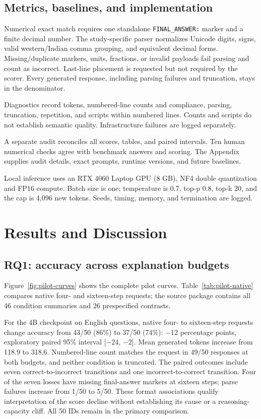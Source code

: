 \documentclass[11pt]{article}
\begin{document}
\subsection{Metrics, baselines, and implementation}
Numerical exact match requires one standalone \texttt{FINAL\_ANSWER:} marker and a finite decimal number. The study-specific parser normalizes Unicode digits, signs, valid western/Indian comma grouping, and equivalent decimal forms. Missing/duplicate markers, units, fractions, or invalid payloads fail parsing and count as incorrect. Last-line placement is requested but not required by the scorer. Every generated response, including parsing failures and truncation, stays in the denominator.

Diagnostics record tokens, numbered-line counts and compliance, parsing, truncation, repetition, and scripts within numbered lines. Counts and scripts do not establish semantic quality. Infrastructure failures are logged separately.

A separate audit reconciles all scores, tables, and paired intervals. Ten human numerical checks agree with benchmark answers and scoring. The Appendix supplies audit details, exact prompts, runtime versions, and future baselines.

Local inference uses an RTX 4060 Laptop GPU (8 GB), NF4 double quantization and FP16 compute. Batch size is one; temperature is 0.7, top-p 0.8, top-k 20, and the cap is 4,096 new tokens. Seeds, timing, memory, and termination are logged.

\section{Results and Discussion}
\subsection{RQ1: accuracy across explanation budgets}
Figure~\ref{fig:pilot-curves} shows the complete pilot curves. Table~\ref{tab:pilot-native} compares native four- and sixteen-step requests; the source package contains all 46 condition summaries and 26 prespecified contrasts.



For the 4B checkpoint on English questions, native four- to sixteen-step requests change accuracy from 43/50 (86\%) to 37/50 (74\%): $-12$ percentage points, exploratory paired 95\% interval [$-24$, $-2$]. Mean generated tokens increase from 118.9 to 318.6. Numbered-line count matches the request in 49/50 responses at both budgets, and neither condition is truncated. The paired outcomes include seven correct-to-incorrect transitions and one incorrect-to-correct transition. Four of the seven losses have missing final-answer markers at sixteen steps; parse failures increase from 1/50 to 5/50. These format associations qualify interpretation of the score decline without establishing its cause or a reasoning-capacity cliff. All 50 IDs remain in the primary comparison.
\end{document}
